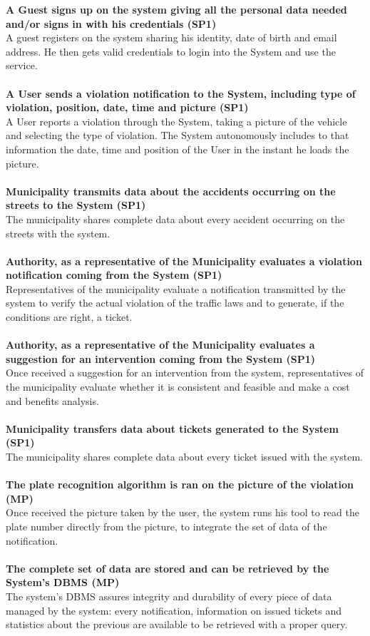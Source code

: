\documentclass {article}
\begin{document}
	{\bf A Guest signs up on the system giving all the personal data needed and/or signs in with his credentials  (SP1)} \\
		A guest registers on the system sharing his identity, date of birth and email address. He then gets valid credentials to login into the System and use the service. \\ \\
	{\bf A User sends a violation notification to the System, including type of violation, position, date, time and picture (SP1)} \\
		A User reports a violation through the System, taking a picture of the vehicle and selecting the type of violation. The System autonomously includes to that information the date, time and position of the User in the instant he loads the picture. \\ \\
	{\bf Municipality transmits data about the accidents occurring on the streets to the System (SP1)}\\
		The municipality shares complete data about every accident occurring on the streets with the system.\\ \\
	{\bf Authority, as a representative of the Municipality evaluates a violation notification coming from the System (SP1)}\\ 
		Representatives of the municipality evaluate a notification transmitted by the system to verify the actual violation of the traffic laws and to generate, if the conditions are right, a ticket. \\ \\
	{\bf  Authority, as a representative of the Municipality evaluates a suggestion for an intervention coming from the System (SP1)}\\ 
		Once received a suggestion for an intervention from the system, representatives of the municipality evaluate whether it is consistent and feasible and make a cost and benefits analysis.\\ \\
	{\bf Municipality transfers data about tickets generated to the System (SP1)}\\
		The municipality shares complete data about every ticket issued with the system.\\ \\
	{\bf The plate recognition algorithm is ran on the picture of the violation (MP)}\\
		Once received the picture taken by the user, the system runs his tool to read the plate number directly from the picture, to integrate the set of data of the notification.\\ \\
	{\bf The complete set of data are stored and can be retrieved by the System's DBMS (MP)}\\
		The system’s DBMS assures integrity and durability of every piece of data managed by the system: every notification, information on issued tickets and statistics about the previous are available to be retrieved with a proper query.\\
		
\end{document}
